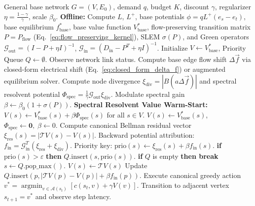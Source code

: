 \documentclass[11pt,a4paper]{article}
\begin{document}
\begin{algorithm}[t]
\caption{Spectral-Laplacian Prioritized Sweeping (SL-PS)}
\label{alg:sl_ps}
\begin{algorithmic}[1]
\REQUIRE General base network $G = (V, E_0)$, demand $q$, budget $K$, discount $\gamma$, regularizer $\eta = \frac{1-\gamma}{\gamma}$, scale $\beta_0$.
\STATE \textbf{Offline:} Compute $L$, $L^+$, base potentials $\phi = q L^+ (e_s - e_t)$, base equilibrium $f_{\text{base}}^*$, base value function $V_{\text{base}}^*$, flow-preserving transition matrix $P = P_{\text{flow}}$ (Eq.~\eqref{eq:flow_preserving_kernel}), SLEM $\sigma(P)$, and Green operators $\mathcal{G}_{\text{out}} = (I - P + \eta I)^{-1}$, $\mathcal{G}_{\text{in}} = (D_{\text{in}} - P^T + \eta I)^{-1}$.
\STATE Initialize $V \leftarrow V_{\text{base}}^*$, Priority Queue $Q \leftarrow \emptyset$.
    \STATE Observe network link status.
        \STATE Compute base edge flow shift $\Delta \vec{f}$ via closed-form electrical shift (Eq.~\eqref{eq:closed_form_delta_f}) or augmented equilibrium solver.
        \STATE Compute node divergence $\xi_{\text{div}} = |B (a \Delta \vec{f})|$ and spectral resolvent potential $\Phi_{\text{spec}} = \frac{1}{\gamma} \mathcal{G}_{\text{out}} \xi_{\text{div}}$.
        \STATE Modulate spectral gain $\beta \leftarrow \beta_0 (1 + \sigma(P))$.
        \STATE \textbf{Spectral Resolvent Value Warm-Start:} $V(s) \leftarrow V_{\text{base}}^*(s) + \beta \Phi_{\text{spec}}(s)$ for all $s \in V$.
        \STATE $V(s) \leftarrow V_{\text{base}}^*(s)$, $\Phi_{\text{spec}} \leftarrow \mathbf{0}, \; \beta \leftarrow 0$.
    \ENDIF
    \STATE Compute canonical Bellman residual vector $\xi_{\text{res}}(s) = |\mathcal{T} V(s) - V(s)|$.
    \STATE Backward potential attribution: $f_{\text{in}} = \mathcal{G}_{\text{in}}^T (\xi_{\text{res}} + \xi_{\text{div}})$.
        \STATE Priority key: $\text{prio}(s) \leftarrow \xi_{\text{res}}(s) + \beta f_{\text{in}}(s)$.
        \STATE \textbf{if} $\text{prio}(s) > \varepsilon$ \textbf{then} $Q.\text{insert}(s, \text{prio}(s))$.
    \ENDFOR
        \STATE \textbf{if} $Q$ is empty \textbf{then break}
        \STATE $s \leftarrow Q.\text{pop\_max}()$.
        \STATE $V(s) \leftarrow \mathcal{T} V(s)$ \quad {}
            \STATE Update $Q.\text{insert}(p, |\mathcal{T} V(p) - V(p)| + \beta f_{\text{in}}(p))$.
        \ENDFOR
    \ENDFOR
    \STATE Execute canonical greedy action $v^* = \operatorname{argmin}_{v \in \mathcal{A}(s_t)} [ c(s_t, v) + \gamma V(v) ]$.
    \STATE Transition to adjacent vertex $s_{t+1} = v^*$ and observe step latency.
\ENDFOR
\end{algorithmic}
\end{algorithm}
\end{document}
